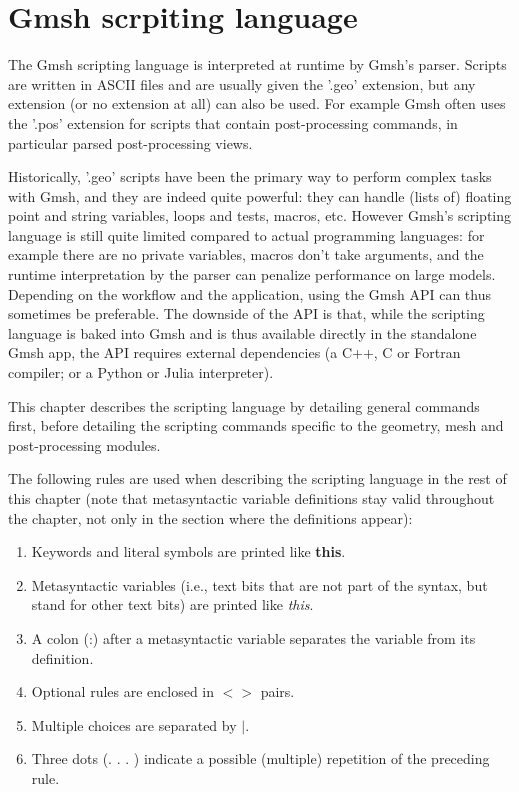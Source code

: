 \documentclass[dvipdfmx, 9pt, a4paper]{article}
\numberwithin{equation}{section}
\begin{document}
\section{Gmsh scrpiting language}
The Gmsh scripting language is interpreted at runtime by Gmsh's parser. Scripts are written in ASCII files and are usually given the '.geo' extension, but any extension (or no extension at all) can also be used. For example Gmsh often uses the '.pos' extension for scripts that
contain post-processing commands, in particular parsed post-processing views.\par
Historically, '.geo' scripts have been the primary way to perform complex tasks with Gmsh, and they are indeed quite powerful: they can handle (lists of) floating point and string variables, loops and tests, macros, etc. However Gmsh's scripting language is still quite limited compared to actual programming languages: for example there are no private variables, macros don't take arguments, and the runtime interpretation by the parser can penalize performance on large models. Depending on the workflow and the application, using the Gmsh API can thus sometimes be preferable. The downside of the API is that, while the scripting language is baked into Gmsh and is thus available directly in the standalone Gmsh app, the API requires external dependencies (a C++, C or Fortran compiler; or a Python or Julia interpreter).\par
This chapter describes the scripting language by detailing general commands first, before detailing the scripting commands specific to the
geometry, mesh and post-processing modules.\par
The following rules are used when describing the scripting language in the rest of this chapter (note that metasyntactic variable definitions stay valid throughout the chapter, not only in the section where the definitions appear):
\begin{enumerate}
\item Keywords and literal symbols are printed like {\bf this}.
\item Metasyntactic variables (i.e., text bits that are not part of the syntax, but stand for other text bits) are printed like {\it this}.
\item A colon (:) after a metasyntactic variable separates the variable from its definition.
\item Optional rules are enclosed in $< >$ pairs.
\item  Multiple choices are separated by $|$.
\item Three dots (. . . ) indicate a possible (multiple) repetition of the preceding rule.
\end{enumerate}
\end{document}
